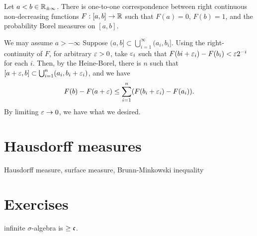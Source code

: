 \documentclass{../../large}
\begin{document}
\begin{prb}
\begin{parts}
\item Let $a<b\in\mathbb{R}_{\pm\infty}$. There is one-to-one correspondence between right continuous non-decreasing functions $F:[a,b]\to\mathbb{R}$ such that $F(a)=0$, $F(b)=1$, and the probability Borel measures on $[a,b]$.
\item 
\end{parts}
\end{prb}
\begin{pf}
We may assume $a>-\infty$
Suppose $(a,b]\subset\bigcup_{i=1}^\infty(a_i,b_i]$.
Using the right-continuity of $F$, for arbitrary $\varepsilon>0$, take $\varepsilon_i$ such that $F(bi+\varepsilon_i)-F(b_i)<\varepsilon2^{-i}$ for each $i$.
Then, by the Heine-Borel, there is $n$ such that $[a+\varepsilon,b]\subset\bigcup_{i=1}^n(a_i,b_i+\varepsilon_i)$, and we have
\[F(b)-F(a+\varepsilon)\le\sum_{i=1}^n(F(b_i+\varepsilon_i)-F(a_i)).\]
By limiting $\varepsilon\to0$, we have what we desired.

\end{pf}

\begin{prb}
\end{prb}

\begin{prb}
\end{prb}


\section{Hausdorff measures}

Hausdorff measure, surface measure, Brunn-Minkowski inequality

\section*{Exercises}
\begin{prb}

\end{prb}

\begin{prb}[Cardinalities]
infinite $\sigma$-algebra is $\ge\mathfrak{c}$.

\end{prb}
\end{document}
